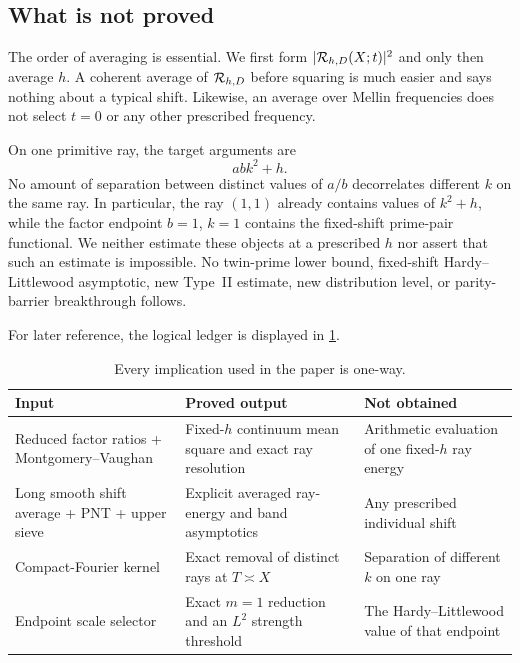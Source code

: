 \subsection{What is not proved}

The order of averaging is essential.  We first form
$|\mathcal R_{h,D}(X;t)|^2$ and only then average $h$.  A coherent average of
$\mathcal R_{h,D}$ before squaring is much easier and says nothing about a
typical shift.  Likewise, an average over Mellin frequencies does not
select $t=0$ or any other prescribed frequency.

On one primitive ray, the target arguments are
\[
 abk^2+h.
\]
No amount of separation between distinct values of $a/b$ decorrelates
different $k$ on the same ray.  In particular, the ray $(1,1)$ already
contains values of $k^2+h$, while the factor endpoint $b=1$, $k=1$
contains the fixed-shift prime-pair functional.  We neither estimate these
objects at a prescribed $h$ nor assert that such an estimate is
impossible.  No twin-prime lower bound, fixed-shift Hardy--Littlewood
asymptotic, new Type~II estimate, new distribution level, or parity-barrier
breakthrough follows.

For later reference, the logical ledger is displayed in
\cref{tab:intro-ledger}.

\begin{table}[ht]
\centering
\small
\begin{tabular}{p{}p{}p{}}
\toprule
Input & Proved output & Not obtained\\
\midrule
Reduced factor ratios + Montgomery--Vaughan
 & Fixed-$h$ continuum mean square and exact ray resolution
 & Arithmetic evaluation of one fixed-$h$ ray energy\\
Long smooth shift average + PNT + upper sieve
 & Explicit averaged ray-energy and band asymptotics
 & Any prescribed individual shift\\
Compact-Fourier kernel
 & Exact removal of distinct rays at $T\asymp X$
 & Separation of different $k$ on one ray\\
Endpoint scale selector
 & Exact $m=1$ reduction and an $L^2$ strength threshold
 & The Hardy--Littlewood value of that endpoint\\
\bottomrule
\end{tabular}
\caption{Every implication used in the paper is one-way.}
\label{tab:intro-ledger}
\end{table}
